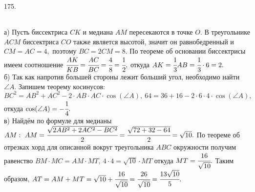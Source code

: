 175. \begin{figure}[ht!]
\end{figure}\\
а) Пусть биссектриса $CK$ и медиана $AM$ пересекаются в точке $O.$ В треугольнике $ACM$ биссектриса $CO$ также является высотой, значит он равнобедренный и $CM=AC=4,$ поэтому $BC=2CM=8.$ По теореме об основании биссектрисы имеем соотношение $\cfrac{AK}{KB}=\cfrac{AC}{BC}=\cfrac{4}{8}=\cfrac{1}{2},$ откуда $AK=\cfrac{1}{3}AB=\cfrac{1}{3}\cdot6=2.$\\
б) Так как напротив большей стороны лежит больший угол, необходимо найти $\angle A.$ Запишем теорему косинусов: $BC^2=AB^2+AC^2-2\cdot AB\cdot AC\cdot \cos(\angle A),\ 64=36+16-2\cdot6\cdot4\cdot \cos(\angle A),$ откуда $\cos(\angle A)=-\cfrac{1}{4}.$\\
в) Найдём по формуле для медианы $AM:\ AM=\cfrac{\sqrt{2AB^2+2AC^2-BC^2}}{2}=\cfrac{\sqrt{72+32-64}}{2}=\sqrt{10}.$ По теореме об отрезках хорд для описанной вокруг треугольника $ABC$ окружности получим равенство $BM\cdot MC= AM\cdot MT,\ 4\cdot4=\sqrt{10}\cdot MT$ откуда $MT=\cfrac{16}{\sqrt{10}}.$ Таким образом,
$AT=AM+MT=\sqrt{10}+\cfrac{16}{\sqrt{10}}=\cfrac{26}{\sqrt{10}}=\cfrac{13\sqrt{10}}{5}.$\\
